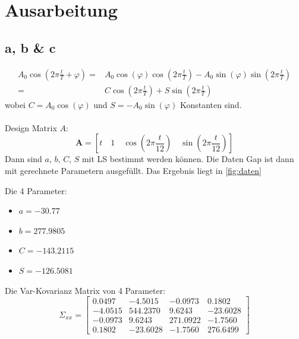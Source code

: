 \chapter{Ausarbeitung}
\section{a, b \& c}
\begin{align*}
	A_0 \cos (2\pi\frac{t}{T} + \varphi) = & A_0 \cos(\varphi) \cos(2 \pi \frac{t}{T}) - A_0 \sin (\varphi) \sin(2\pi\frac{t}{T}) \\
	 = & C \cos(2 \pi \frac{t}{T}) + S \sin(2\pi\frac{t}{T})
\end{align*}
wobei $C = A_0 \cos(\varphi)$ und $S = - A_0 \sin (\varphi)$ Konstanten sind. \\\\
Design Matrix $A$:
\begin{equation}
	\bm{A} = \left[t\quad 1 \quad \cos(2 \pi \frac{t}{12}) \quad \sin(2\pi\frac{t}{12})\right]
\end{equation}
Dann sind $a$, $b$, $C$, $S$ mit LS bestimmt werden können. Die Daten Gap ist dann mit gerechnete Parametern ausgefüllt. Das Ergebnis liegt in \autoref{fig:daten}
\begin{figure}[htpb]\centering
	\caption{}
	\label{fig:daten}
\end{figure}
\clearpage
Die 4 Parameter:
\begin{itemize}
	\item $a = -30.77$
	\item $b = 277.9805$
	\item $C = -143.2115$
	\item $S = -126.5081$  
\end{itemize}
Die Var-Kovarianz Matrix von 4 Parameter:
\begin{equation*}
	\Sigma_{xx} = \begin{bmatrix}
		0.0497 & -4.5015 & -0.0973 & 0.1802 \\
		-4.0515 & 544.2370 & 9.6243 & -23.6028 \\
		-0.0973 & 9.6243 & 271.0922 & -1.7560 \\
		0.1802 & -23.6028 & -1.7560 & 276.6499
	\end{bmatrix}
\end{equation*}

